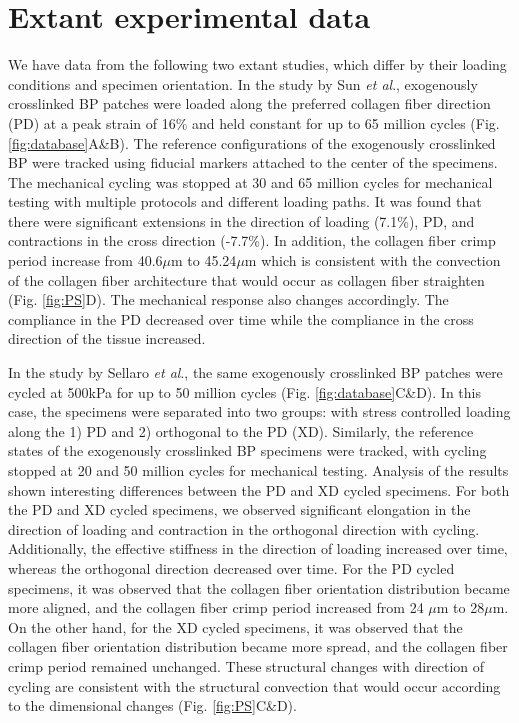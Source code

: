 \section{Extant experimental data}
\label{sec:database}

	We have data from the following two extant studies, which differ by their loading conditions and specimen orientation. 
	In the study by Sun \textit{et al}.\cite{sun_response_2004}, exogenously crosslinked BP patches were loaded along the preferred collagen fiber direction (PD) at a peak strain of 16\% and held constant for up to 65 million cycles (Fig. \ref{fig:database}A\&B). 
	The reference configurations of the exogenously crosslinked BP were tracked using fiducial markers attached to the center of the specimens\cite{sacks_biaxial_2000}. 
	The mechanical cycling was stopped at 30 and 65 million cycles for mechanical testing with multiple protocols and different loading paths. 
	It was found that there were significant extensions in the direction of loading (7.1\%), PD, and contractions in the cross direction (-7.7\%). 
	In addition, the collagen fiber crimp period increase from 40.6$\mu$m to 45.24$\mu$m which is consistent with the convection of the collagen fiber architecture that would occur as collagen fiber straighten (Fig. \ref{fig:PS}D). 
	The mechanical response also changes accordingly. 
	The compliance in the PD decreased over time while the compliance in the cross direction of the tissue increased. 

	In the study by Sellaro \textit{et al}.\cite{sellaro_effects_2007}, the same exogenously crosslinked BP patches were cycled at 500kPa for up to 50 million cycles (Fig. \ref{fig:database}C\&D). 
	In this case, the specimens were separated into two groups: with stress controlled loading along the 1) PD and 2) orthogonal to the PD (XD). 
	Similarly, the reference states of the exogenously crosslinked BP specimens were tracked, with cycling stopped at 20 and 50 million cycles for mechanical testing. 
	Analysis of the results shown interesting differences between the PD and XD cycled specimens. 
	For both the PD and XD cycled specimens, we observed significant elongation in the direction of loading and contraction in the orthogonal direction with cycling. 
	Additionally, the effective stiffness in the direction of loading increased over time, whereas the orthogonal direction decreased over time. 
	For the PD cycled specimens, it was observed that the collagen fiber orientation distribution became more aligned, and the collagen fiber crimp period increased from 24 $\mu$m to 28$\mu$m. 
	On the other hand, for the XD cycled specimens, it was observed that the collagen fiber orientation distribution became more spread, and the collagen fiber crimp period remained unchanged. 
	These structural changes with direction of cycling are consistent with the structural convection that would occur according to the dimensional changes (Fig. \ref{fig:PS}C\&D). 

